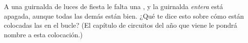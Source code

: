\begin{exercise}[$\star\star$]\label{exo:g3:first-electric-circuit:11}
A una guirnalda de luces de fiesta le falta una , y la
guirnalda \emph{entera} está apagada, aunque todas las demás
 están bien. ¿Qué te dice esto sobre cómo están colocadas
las  en el bucle? (El capítulo de circuitos del año que
viene le pondrá nombre a esta colocación.)
\end{exercise}
